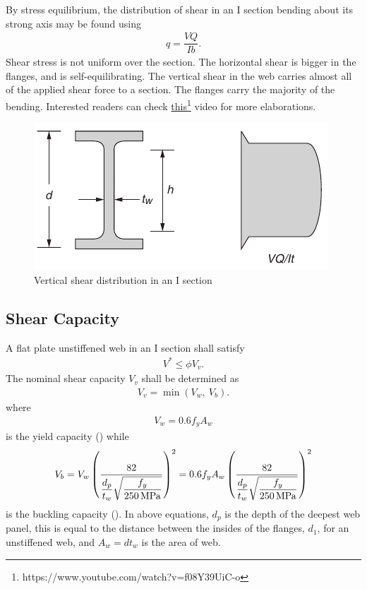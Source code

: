 By stress equilibrium, the distribution of shear in an I section bending about its strong axis may be found using
\begin{gather*}
q=\dfrac{VQ}{Ib}.
\end{gather*}
Shear stress is not uniform over the section. The horizontal shear is bigger in the flanges, and is self-equilibrating. The vertical shear in the web carries almost all of the applied shear force to a section. The flanges carry the majority of the bending. Interested readers can check \href{https://www.youtube.com/watch?v=f08Y39UiC-o}{this}\footnote{https://www.youtube.com/watch?v=f08Y39UiC-o} video for more elaborations.
\begin{figure}[H]
\centering\footnotesize
\includegraphics{PIC/CH05/VSHEAR}
\caption{Vertical shear distribution in an I section}
\end{figure}
\subsection{Shear Capacity}
A flat plate unstiffened web in an I section shall satisfy
\begin{gather}
V^*\leqslant\phi{}V_v.
\end{gather}
The nominal shear capacity $V_v$ shall be determined as
\begin{gather}
V_v=\min\left(V_w,~V_b\right).
\end{gather}
where
\begin{gather}
V_w=0.6f_yA_w
\end{gather}
is the yield capacity () while
\begin{gather}
V_b=V_w\left(\dfrac{82}{\dfrac{d_p}{t_w}\sqrt{\dfrac{f_y}{\SI{250}{\mega\pascal}}}}\right)^2=0.6f_yA_w\left(\dfrac{82}{\dfrac{d_p}{t_w}\sqrt{\dfrac{f_y}{\SI{250}{\mega\pascal}}}}\right)^2
\end{gather}
is the buckling capacity (). In above equations, $d_p$ is the depth of the deepest web panel, this is equal to the distance between the insides of the flanges, $d_1$, for an unstiffened web, and $A_w=dt_w$ is the area of web.

